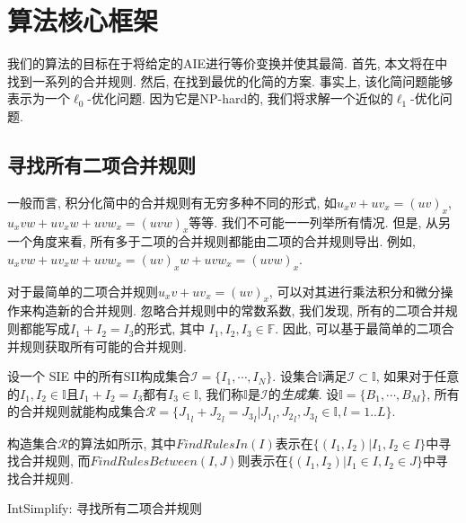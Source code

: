 \section{算法核心框架} \label{Simplify-03}
我们的算法的目标在于将给定的AIE进行等价变换并使其最简. 首先, 本文将在中找到一系列的合并规则. 然后, 在找到最优的化简的方案. 事实上, 该化简问题能够表示为一个$\ell_0$-优化问题. 因为它是NP-hard的, 我们将求解一个近似的$\ell_1$-优化问题. 


\subsection{寻找所有二项合并规则}\label{all_rules-03}
一般而言, 积分化简中的合并规则有无穷多种不同的形式, 如$u_x v + u v_x = (uv)_x$, $u_x v w+u v_x w + u v w_x = (uvw)_x$等等. 我们不可能一一列举所有情况. 但是, 从另一个角度来看, 所有多于二项的合并规则都能由二项的合并规则导出. 例如, $u_xvw+uv_xw+uvw_x=(uv)_xw+uvw_x=(uvw)_x$. 

对于最简单的二项合并规则$u_x v + u v_x = (uv)_x$, 可以对其进行乘法\D 积分和微分操作来构造新的合并规则. 忽略合并规则中的常数系数, 我们发现, 所有的二项合并规则都能写成$I_1+I_2=I_3$的形式, 其中 $I_1,I_2,I_3\in \mathbb F$. 因此, 可以基于最简单的二项合并规则获取所有可能的合并规则. 

设一个 SIE 中的所有SII构成集合$\mathcal I =\{I_1,\cdots,I_N\}$. 设集合$\mathbb I$满足$\mathcal I \subset \mathbb I$, 如果对于任意的$I_1,I_2\in \mathbb I$且$I_1+I_2=I_3$都有$I_3\in \mathbb I$, 我们称$\mathbb I$是$\mathcal I$的\emph{生成集}. 设$\mathbb I=\{B_1,\cdots,B_M\}$, 所有的合并规则就能构成集合$\mathcal R=\{{J_1}_l+{J_2}_l={J_3}_l|{J_1}_l,{J_2}_l,{J_3}_l \in \mathbb I, l=1..L\}$.

构造集合$\mathcal R$的算法如所示, 其中$FindRulesIn(I)$表示在$\{(I_1,I_2)|I_1, I_2 \in I\}$中寻找合并规则, 而$FindRulesBetween(I,J)$则表示在$\{(I_1,I_2)|I_1\in I, I_2 \in J\}$中寻找合并规则. 

\begin{algorithm}
\caption{IntSimplify: 寻找所有二项合并规则}
\label{FindAllRules}
\end{algorithm}


